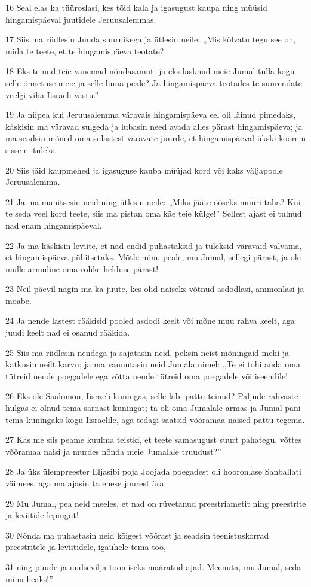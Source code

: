 \par 16 Seal elas ka tüüroslasi, kes tõid kala ja igasugust kaupa ning müüsid hingamispäeval juutidele Jeruusalemmas.
\par 17 Siis ma riidlesin Juuda suurnikega ja ütlesin neile: „Mis kõlvatu tegu see on, mida te teete, et te hingamispäeva teotate?
\par 18 Eks teinud teie vanemad nõndasamuti ja eks lasknud meie Jumal tulla kogu selle õnnetuse meie ja selle linna peale? Ja hingamispäeva teotades te suurendate veelgi viha Iisraeli vastu.”
\par 19 Ja niipea kui Jeruusalemma väravais hingamispäeva eel oli läinud pimedaks, käskisin ma väravad sulgeda ja lubasin need avada alles pärast hingamispäeva; ja ma seadsin mõned oma sulastest väravate juurde, et hingamispäeval ükski koorem sisse ei tuleks.
\par 20 Siis jäid kaupmehed ja igasuguse kauba müüjad kord või kaks väljapoole Jeruusalemma.
\par 21 Ja ma manitsesin neid ning ütlesin neile: „Miks jääte ööseks müüri taha? Kui te seda veel kord teete, siis ma pistan oma käe teie külge!” Sellest ajast ei tulnud nad enam hingamispäeval.
\par 22 Ja ma käskisin leviite, et nad endid puhastaksid ja tuleksid väravaid valvama, et hingamispäeva pühitsetaks. Mõtle minu peale, mu Jumal, sellegi pärast, ja ole mulle armuline oma rohke helduse pärast!
\par 23 Neil päevil nägin ma ka juute, kes olid naiseks võtnud asdodlasi, ammonlasi ja moabe.
\par 24 Ja nende lastest rääkisid pooled asdodi keelt või mõne muu rahva keelt, aga juudi keelt nad ei osanud rääkida.
\par 25 Siis ma riidlesin nendega ja sajatasin neid, peksin neist mõningaid mehi ja katkusin neilt karvu; ja ma vannutasin neid Jumala nimel: „Te ei tohi anda oma tütreid nende poegadele ega võtta nende tütreid oma poegadele või iseendile!
\par 26 Eks ole Saalomon, Iisraeli kuningas, selle läbi pattu teinud? Paljude rahvaste hulgas ei olnud tema sarnast kuningat; ta oli oma Jumalale armas ja Jumal pani tema kuningaks kogu Iisraelile, aga tedagi saatsid võõramaa naised pattu tegema.
\par 27 Kas me siis peame kuulma teistki, et teete samasugust suurt pahategu, võttes võõramaa naisi ja murdes nõnda meie Jumalale truudust?”
\par 28 Ja üks ülempreester Eljasibi poja Joojada poegadest oli hooronlase Sanballati väimees, aga ma ajasin ta enese juurest ära.
\par 29 Mu Jumal, pea neid meeles, et nad on rüvetanud preestriametit ning preestrite ja leviitide lepingut!
\par 30 Nõnda ma puhastasin neid kõigest võõrast ja seadsin teenistuskorrad preestritele ja leviitidele, igaühele tema töö,
\par 31 ning puude ja uudsevilja toomiseks määratud ajad. Meenuta, mu Jumal, seda minu heaks!”




